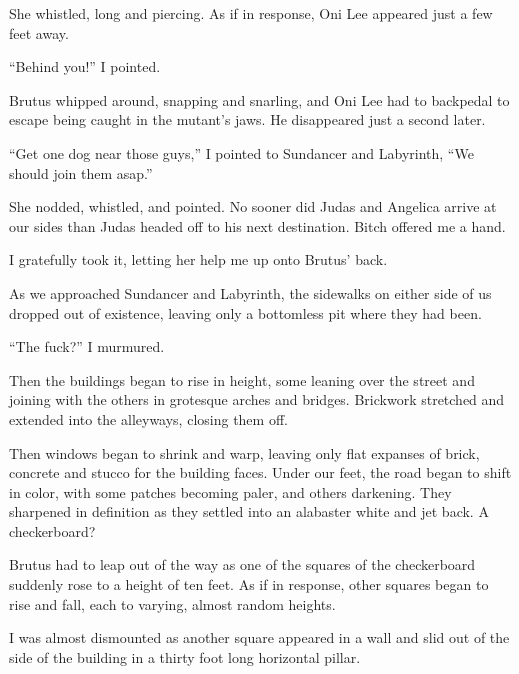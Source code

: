 She whistled, long and piercing.  As if in response, Oni Lee appeared just a few feet away.



``Behind you!'' I pointed.



Brutus whipped around, snapping and snarling, and Oni Lee had to backpedal to escape being caught in the mutant's jaws.  He disappeared just a second later.



``Get one dog near those guys,'' I pointed to Sundancer and Labyrinth, ``We should join them asap.''



She nodded, whistled, and pointed.  No sooner did Judas and Angelica arrive at our sides than Judas headed off to his next destination.  Bitch offered me a hand.



I gratefully took it, letting her help me up onto Brutus' back.



As we approached Sundancer and Labyrinth, the sidewalks on either side of us dropped out of existence, leaving only a bottomless pit where they had been.



``The fuck?'' I murmured.



Then the buildings began to rise in height, some leaning over the street and joining with the others in grotesque arches and bridges.  Brickwork stretched and extended into the alleyways, closing them off.



Then windows began to shrink and warp, leaving only flat expanses of brick, concrete and stucco for the building faces.  Under our feet, the road began to shift in color, with some patches becoming paler, and others darkening.  They sharpened in definition as they settled into an alabaster white and jet back.  A checkerboard?



Brutus had to leap out of the way as one of the squares of the checkerboard suddenly rose to a height of ten feet.  As if in response, other squares began to rise and fall, each to varying, almost random heights.



I was almost dismounted as another square appeared in a wall and slid out of the side of the building in a thirty foot long horizontal pillar.



